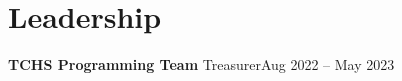 \section{Leadership}
  \resumeSubHeadingListStart

    \resumeSubheading
      {\textbf{TCHS Programming Team}}{}
      {Treasurer}{Aug 2022 -- May 2023}
      \resumeItemListStart
        \resumeItem{}

        \resumeItem{}
      \resumeItemListEnd
      
  \resumeSubHeadingListEnd
